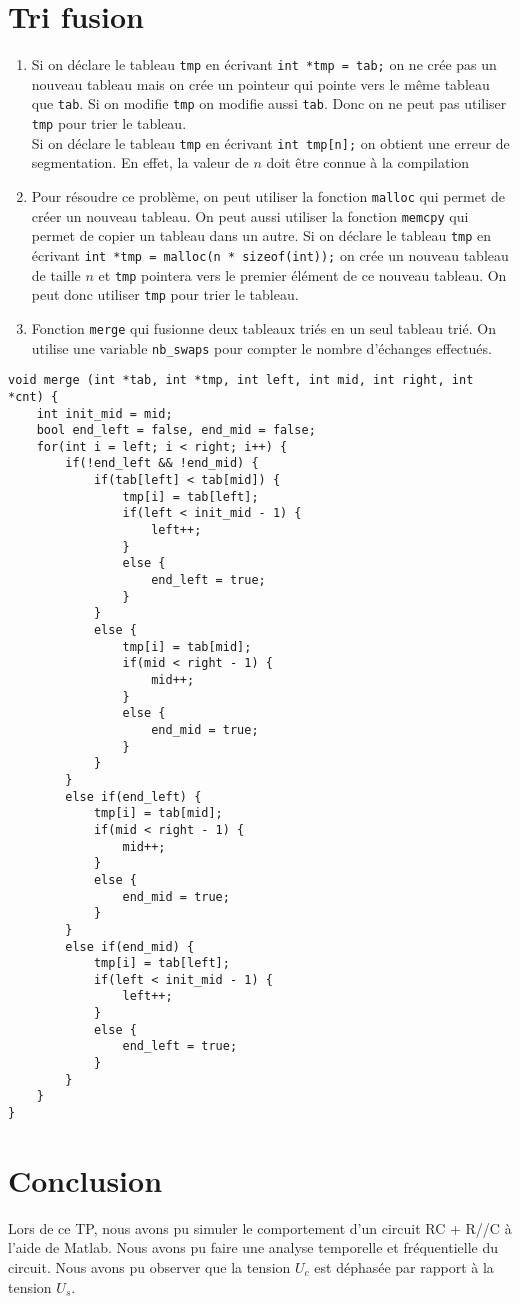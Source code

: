 \documentclass[12pt]{article}
\begin{document}
\section{Tri fusion}
\begin{enumerate}
    \item Si on déclare le tableau \texttt{tmp} en écrivant \texttt{int *tmp = tab;} on ne crée pas un nouveau tableau mais on crée un pointeur qui pointe vers le même tableau que \texttt{tab}. Si on modifie \texttt{tmp} on modifie aussi \texttt{tab}. Donc on ne peut pas utiliser \texttt{tmp} pour trier le tableau. \\
    Si on déclare le tableau \texttt{tmp} en écrivant \texttt{int tmp[n];} on obtient une erreur de segmentation. En effet, la valeur de $n$ doit être connue à la compilation \\
    \item Pour résoudre ce problème, on peut utiliser la fonction \texttt{malloc} qui permet de créer un nouveau tableau. On peut aussi utiliser la fonction \texttt{memcpy} qui permet de copier un tableau dans un autre. Si on déclare le tableau \texttt{tmp} en écrivant \texttt{int *tmp = malloc(n * sizeof(int));} on crée un nouveau tableau de taille $n$ et \texttt{tmp} pointera vers le premier élément de ce nouveau tableau. On peut donc utiliser \texttt{tmp} pour trier le tableau. 
    \item Fonction \texttt{merge} qui fusionne deux tableaux triés en un seul tableau trié. On utilise une variable \texttt{nb\_swaps} pour compter le nombre d'échanges effectués.
\end{enumerate}
\begin{lstlisting}[style=languageClarge, caption=Implémentation de la fonction \texttt{merge}]
void merge (int *tab, int *tmp, int left, int mid, int right, int *cnt) {
    int init_mid = mid;
    bool end_left = false, end_mid = false;
    for(int i = left; i < right; i++) {
        if(!end_left && !end_mid) {
            if(tab[left] < tab[mid]) {
                tmp[i] = tab[left];
                if(left < init_mid - 1) {
                    left++;
                }
                else {
                    end_left = true;
                }
            }
            else {
                tmp[i] = tab[mid];
                if(mid < right - 1) {
                    mid++;
                }
                else {
                    end_mid = true;
                }
            }
        }
        else if(end_left) {
            tmp[i] = tab[mid];
            if(mid < right - 1) {
                mid++;
            }
            else {
                end_mid = true;
            }
        }
        else if(end_mid) {
            tmp[i] = tab[left];
            if(left < init_mid - 1) {
                left++;
            }
            else {
                end_left = true;
            }
        }
    }
}
\end{lstlisting}

\section{Conclusion}
Lors de ce TP, nous avons pu simuler le comportement d'un circuit RC + R//C à l'aide de Matlab. Nous avons pu faire une analyse temporelle et fréquentielle du circuit. Nous avons pu observer que la tension $U_c$ est déphasée par rapport à la tension $U_s$.
\end{document}
